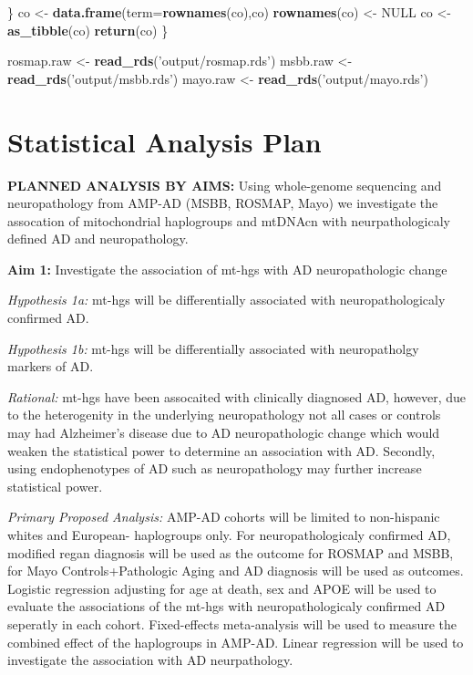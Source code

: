 \documentclass[]{book}
\newenvironment{Shaded}{\begin{snugshade}}{\end{snugshade}}
\newcommand{\DataTypeTok}[1]{\textcolor[rgb]{0.13,0.29,0.53}{#1}}
\newcommand{\KeywordTok}[1]{\textcolor[rgb]{0.13,0.29,0.53}{\textbf{#1}}}
\newcommand{\NormalTok}[1]{#1}
\newcommand{\OtherTok}[1]{\textcolor[rgb]{0.56,0.35,0.01}{#1}}
\newcommand{\StringTok}[1]{\textcolor[rgb]{0.31,0.60,0.02}{#1}}
\begin{document}
\begin{Shaded}
\begin{Highlighting}[]
\NormalTok{  \}}
\NormalTok{  co <-}\StringTok{ }\KeywordTok{data.frame}\NormalTok{(}\DataTypeTok{term=}\KeywordTok{rownames}\NormalTok{(co),co)}
  \KeywordTok{rownames}\NormalTok{(co) <-}\StringTok{ }\OtherTok{NULL}
\NormalTok{  co <-}\StringTok{ }\KeywordTok{as_tibble}\NormalTok{(co)}
  \KeywordTok{return}\NormalTok{(co)}
\NormalTok{\}}
\end{Highlighting}
\end{Shaded}

\begin{Shaded}
\begin{Highlighting}[]
\NormalTok{rosmap.raw <-}\StringTok{ }\KeywordTok{read_rds}\NormalTok{(}\StringTok{'output/rosmap.rds'}\NormalTok{)}
\NormalTok{msbb.raw <-}\StringTok{ }\KeywordTok{read_rds}\NormalTok{(}\StringTok{'output/msbb.rds'}\NormalTok{)}
\NormalTok{mayo.raw <-}\StringTok{ }\KeywordTok{read_rds}\NormalTok{(}\StringTok{'output/mayo.rds'}\NormalTok{)}
\end{Highlighting}
\end{Shaded}

\hypertarget{statistical-analysis-plan}{%
\section{Statistical Analysis Plan}\label{statistical-analysis-plan}}

\textbf{PLANNED ANALYSIS BY AIMS:} Using whole-genome sequencing and neuropathology from AMP-AD (MSBB, ROSMAP, Mayo) we investigate the assocation of mitochondrial haplogroups and mtDNAcn with neurpathologicaly defined AD and neuropathology.

\textbf{Aim 1:} Investigate the association of mt-hgs with AD neuropathologic change

\emph{Hypothesis 1a:} mt-hgs will be differentially associated with neuropathologicaly confirmed AD.

\emph{Hypothesis 1b:} mt-hgs will be differentially associated with neuropatholgy markers of AD.

\emph{Rational:} mt-hgs have been assocaited with clinically diagnosed AD, however, due to the heterogenity in the underlying neuropathology not all cases or controls may had Alzheimer's disease due to AD neuropathologic change which would weaken the statistical power to determine an association with AD. Secondly, using endophenotypes of AD such as neuropathology may further increase statistical power.

\emph{Primary Proposed Analysis:} AMP-AD cohorts will be limited to non-hispanic whites and European- haplogroups only. For neuropathologicaly confirmed AD, modified regan diagnosis will be used as the outcome for ROSMAP and MSBB, for Mayo Controls+Pathologic Aging and AD diagnosis will be used as outcomes. Logistic regression adjusting for age at death, sex and APOE will be used to evaluate the associations of the mt-hgs with neuropathologicaly confirmed AD seperatly in each cohort. Fixed-effects meta-analysis will be used to measure the combined effect of the haplogroups in AMP-AD. Linear regression will be used to investigate the association with AD neurpathology.
\end{document}
